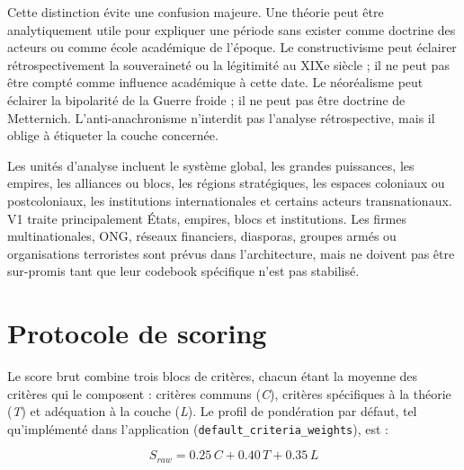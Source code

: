 \documentclass[11pt,a4paper]{article}
\begin{document}
Cette distinction évite une confusion majeure. Une théorie peut être analytiquement utile pour expliquer une période sans exister comme doctrine des acteurs ou comme école académique de l'époque. Le constructivisme peut éclairer rétrospectivement la souveraineté ou la légitimité au XIXe siècle ; il ne peut pas être compté comme influence académique à cette date. Le néoréalisme peut éclairer la bipolarité de la Guerre froide ; il ne peut pas être doctrine de Metternich. L'anti-anachronisme n'interdit pas l'analyse rétrospective, mais il oblige à étiqueter la couche concernée.

Les unités d'analyse incluent le système global, les grandes puissances, les empires, les alliances ou blocs, les régions stratégiques, les espaces coloniaux ou postcoloniaux, les institutions internationales et certains acteurs transnationaux. V1 traite principalement États, empires, blocs et institutions. Les firmes multinationales, ONG, réseaux financiers, diasporas, groupes armés ou organisations terroristes sont prévus dans l'architecture, mais ne doivent pas être sur-promis tant que leur codebook spécifique n'est pas stabilisé.

\section{Protocole de scoring}

Le score brut combine trois blocs de critères, chacun étant la moyenne des critères qui le composent : critères communs (\emph{C}), critères spécifiques à la théorie (\emph{T}) et adéquation à la couche (\emph{L}). Le profil de pondération par défaut, tel qu'implémenté dans l'application (\texttt{default\_criteria\_weights}), est :

\[
S_{raw}=0.25\,C+0.40\,T+0.35\,L
\]
\end{document}
